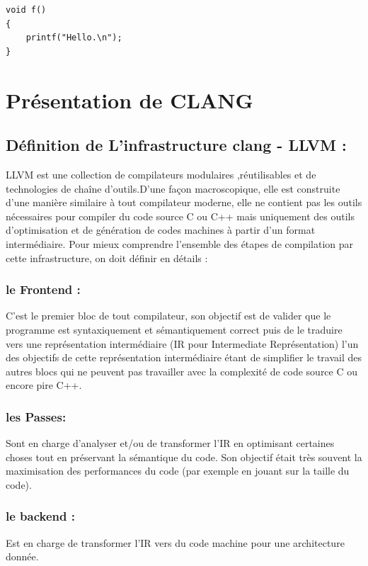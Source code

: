 \documentclass[12pt,titlepage]{article}
\begin{document}
\begin{lstlisting}
void f()
{
    printf("Hello.\n");
}
\end{lstlisting}

\section{Présentation de CLANG} 

\subsection{ Définition de  L’infrastructure clang - LLVM :}
LLVM est une collection de compilateurs modulaires ,réutilisables et de technologies de chaîne d'outils.D’une façon macroscopique, elle est construite d’une manière similaire à tout compilateur moderne, elle ne contient pas les outils nécessaires pour compiler du code source C ou C++ mais uniquement des outils d’optimisation et de génération de codes machines à partir d’un format intermédiaire. 
 Pour mieux comprendre l’ensemble des étapes de compilation par cette infrastructure,   on doit définir en détails :
       
     \subsubsection{  le Frontend : }
     C'est le premier bloc de tout compilateur, son objectif est de valider que le programme est syntaxiquement et sémantiquement correct puis de le traduire vers une représentation intermédiaire (IR pour Intermediate Représentation) l'un des objectifs de cette représentation intermédiaire étant de simplifier le travail des autres blocs qui ne peuvent pas travailler avec la complexité de code source C ou encore pire C++. 

     \subsubsection{ les Passes: }
     Sont en charge d’analyser et/ou de transformer l’IR en optimisant certaines choses tout en préservant la sémantique du code. Son objectif était très souvent la maximisation des performances du code (par exemple en jouant sur la taille du code).

    \subsubsection{ le backend :}
    Est en charge de transformer l’IR vers du code machine pour une architecture donnée.
\end{document}
